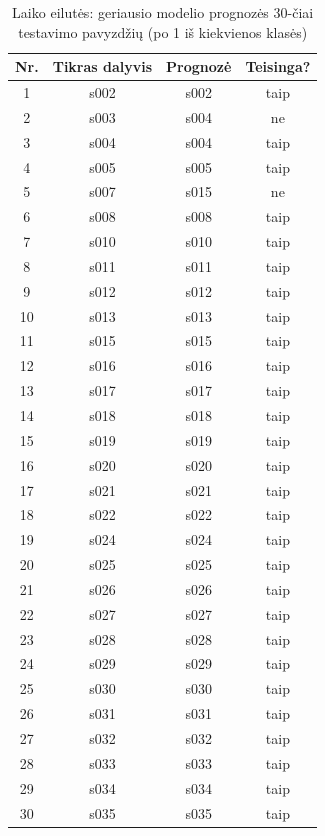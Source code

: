 \documentclass[]{VUMIFTemplateClass}
\begin{document}
\begin{table}[H]
    \centering
    \caption{Laiko eilutės: geriausio modelio prognozės 30-čiai testavimo pavyzdžių (po 1 iš kiekvienos klasės)}
    \label{tab:ts_samples}
    \begin{tabular}{|c|c|c|c|}
        \hline
        \textbf{Nr.} & \textbf{Tikras dalyvis} & \textbf{Prognozė} & \textbf{Teisinga?}\\
        \hline
        1  & s002 & s002 & taip \\ \hline
        2  & s003 & s004 & ne   \\ \hline
        3  & s004 & s004 & taip \\ \hline
        4  & s005 & s005 & taip \\ \hline
        5  & s007 & s015 & ne   \\ \hline
        6  & s008 & s008 & taip \\ \hline
        7  & s010 & s010 & taip \\ \hline
        8  & s011 & s011 & taip \\ \hline
        9  & s012 & s012 & taip \\ \hline
        10 & s013 & s013 & taip \\ \hline
        11 & s015 & s015 & taip \\ \hline
        12 & s016 & s016 & taip \\ \hline
        13 & s017 & s017 & taip \\ \hline
        14 & s018 & s018 & taip \\ \hline
        15 & s019 & s019 & taip \\ \hline
        16 & s020 & s020 & taip \\ \hline
        17 & s021 & s021 & taip \\ \hline
        18 & s022 & s022 & taip \\ \hline
        19 & s024 & s024 & taip \\ \hline
        20 & s025 & s025 & taip \\ \hline
        21 & s026 & s026 & taip \\ \hline
        22 & s027 & s027 & taip \\ \hline
        23 & s028 & s028 & taip \\ \hline
        24 & s029 & s029 & taip \\ \hline
        25 & s030 & s030 & taip \\ \hline
        26 & s031 & s031 & taip \\ \hline
        27 & s032 & s032 & taip \\ \hline
        28 & s033 & s033 & taip \\ \hline
        29 & s034 & s034 & taip \\ \hline
        30 & s035 & s035 & taip \\ \hline
    \end{tabular}
\end{table}
\end{document}
